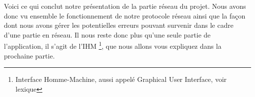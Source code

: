 	Voici ce qui conclut notre présentation de la partie réseau du projet. Nous avons donc vu ensemble le fonctionnement de notre protocole réseau ainsi que la façon dont nous avons gérer les potentielles erreurs pouvant survenir dans le cadre d'une partie en réseau. Il nous reste donc plus qu'une seule partie de l'application, il s'agit de l'IHM \footnote{Interface Homme-Machine, aussi appelé Graphical User Interface, voir lexique}, que nous allons vous expliquez dans la prochaine partie.
